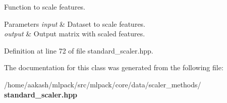 Function to scale features. 


\begin{DoxyParams}{Parameters}
{\em input} & Dataset to scale features. \\
\hline
{\em output} & Output matrix with scaled features. \\
\hline
\end{DoxyParams}


Definition at line 72 of file standard\+\_\+scaler.\+hpp.



The documentation for this class was generated from the following file\+:\begin{DoxyCompactItemize}
\item 
/home/aakash/mlpack/src/mlpack/core/data/scaler\+\_\+methods/\textbf{ standard\+\_\+scaler.\+hpp}\end{DoxyCompactItemize}
